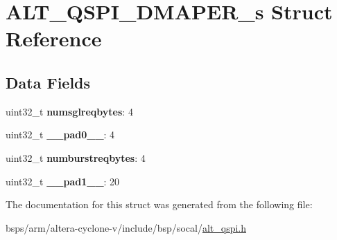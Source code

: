 \hypertarget{structALT__QSPI__DMAPER__s}{}\section{A\+L\+T\+\_\+\+Q\+S\+P\+I\+\_\+\+D\+M\+A\+P\+E\+R\+\_\+s Struct Reference}
\label{structALT__QSPI__DMAPER__s}
\subsection*{Data Fields}
\begin{DoxyCompactItemize}
\item 
\mbox{\label{structALT__QSPI__DMAPER__s_a499a7e73be97047f3f3cc7fdc4602af5}} 
uint32\+\_\+t {\bfseries numsglreqbytes}\+: 4
\item 
\mbox{\label{structALT__QSPI__DMAPER__s_aa7ff4c8cbce7b9cb62febbf1bfeb499a}} 
uint32\+\_\+t {\bfseries \+\_\+\+\_\+pad0\+\_\+\+\_\+}\+: 4
\item 
\mbox{\label{structALT__QSPI__DMAPER__s_a098e59d48625acc80119017480df7bc8}} 
uint32\+\_\+t {\bfseries numburstreqbytes}\+: 4
\item 
\mbox{\label{structALT__QSPI__DMAPER__s_aa6d32d0dc4330c8e295222759f31532c}} 
uint32\+\_\+t {\bfseries \+\_\+\+\_\+pad1\+\_\+\+\_\+}\+: 20
\end{DoxyCompactItemize}


The documentation for this struct was generated from the following file\+:\begin{DoxyCompactItemize}
\item 
bsps/arm/altera-\/cyclone-\/v/include/bsp/socal/\mbox{\hyperlink{include_2bsp_2socal_2alt__qspi_8h}{alt\+\_\+qspi.\+h}}\end{DoxyCompactItemize}
